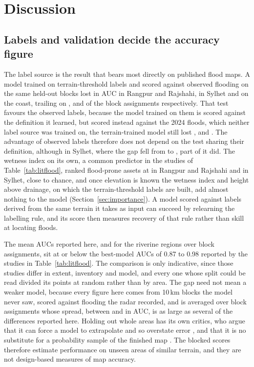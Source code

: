 \section{Discussion}
\label{sec:discussion}

\subsection{Labels and validation decide the accuracy figure}

The label source is the result that bears most directly on published flood maps. A model trained on terrain-threshold labels and scored against observed flooding on the same held-out blocks lost \RRLabelGap{} in AUC in Rangpur and Rajshahi, \SylhetLabelGap{} in Sylhet and \CoastalLabelGap{} on the coast, trailing on \RRLabelAhead{}, \SylhetLabelAhead{} and \CoastalLabelAhead{} of the \RRBenchSeeds{} block assignments respectively. That test favours the observed labels, because the model trained on them is scored against the definition it learned, but scored instead against the 2024 floods, which neither label source was trained on, the terrain-trained model still lost \RRTempProxyGap{}, \SylhetTempProxyGap{} and \CoastalTempProxyGap{}. The advantage of observed labels therefore does not depend on the test sharing their definition, although in Sylhet, where the gap fell from \SylhetLabelGap{} to \SylhetTempProxyGap{}, part of it did. The wetness index on its own, a common predictor in the studies of Table~\ref{tab:litflood}, ranked flood-prone assets at \RRBenchTwiAUC{} in Rangpur and Rajshahi and \SylhetBenchTwiAUC{} in Sylhet, close to chance, and once elevation is known the wetness index and height above drainage, on which the terrain-threshold labels are built, add almost nothing to the model (Section~\ref{sec:importance}). A model scored against labels derived from the same terrain it takes as input can succeed by relearning the labelling rule, and its score then measures recovery of that rule rather than skill at locating floods.

The mean AUCs reported here, \RRBenchBoostingAUC{} and \SylhetBenchBoostingAUC{} for the riverine regions over \RRBenchSeeds{} block assignments, sit at or below the best-model AUCs of 0.87 to 0.98 reported by the studies in Table~\ref{tab:litflood}. The comparison is only indicative, since those studies differ in extent, inventory and model, and every one whose split could be read divided its points at random rather than by area. The gap need not mean a weaker model, because every figure here comes from 10\,km blocks the model never saw, scored against flooding the radar recorded, and is averaged over block assignments whose spread, between \RRBenchBoostingSD{} and \CoastalBenchBoostingSD{} in AUC, is as large as several of the differences reported here. Holding out whole areas has its own critics, who argue that it can force a model to extrapolate and so overstate error \citep{roberts2017}, and that it is no substitute for a probability sample of the finished map \citep{wadoux2021}. The blocked scores therefore estimate performance on unseen areas of similar terrain, and they are not design-based measures of map accuracy.

